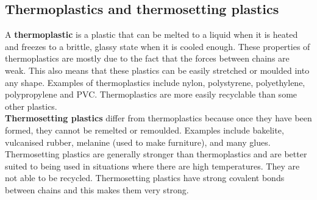 \subsection{Thermoplastics and thermosetting plastics}

A \textbf{thermoplastic} is a plastic that can be melted to a liquid when it is heated and freezes to a brittle, glassy state when it is cooled enough. These properties of thermoplastics are mostly due to the fact that the forces between chains are weak. This also means that these plastics can be easily stretched or moulded into any shape. Examples of thermoplastics include nylon, polystyrene, polyethylene, polypropylene and PVC. Thermoplastics are more easily recyclable than some other plastics.\\

\textbf{Thermosetting plastics} differ from thermoplastics because once they have been formed, they cannot be remelted or remoulded. Examples include bakelite, vulcanised rubber, melanine (used to make furniture), and many glues. Thermosetting plastics are generally stronger than thermoplastics and are better suited to being used in situations where there are high temperatures. They are not able to be recycled. Thermosetting plastics have strong covalent bonds between chains and this makes them very strong.

